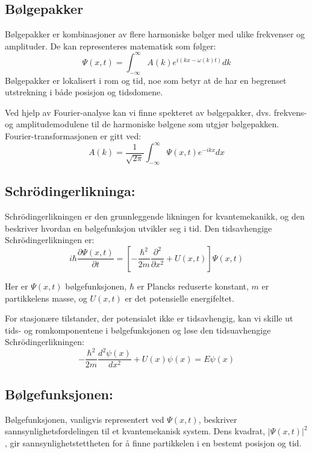 \subsection*{Bølgepakker}

Bølgepakker er kombinasjoner av flere harmoniske bølger med ulike frekvenser og amplituder. De kan representeres matematisk som følger:
\begin{equation*}
\Psi(x,t) = \int_{-\infty}^{\infty} A(k) e^{i(kx - \omega(k)t)} dk
\end{equation*}
Bølgepakker er lokalisert i rom og tid, noe som betyr at de har en begrenset utstrekning i både posisjon og tidsdomene.

Ved hjelp av Fourier-analyse kan vi finne spekteret av bølgepakker, dvs. frekvens- og amplitudemodulene til de harmoniske bølgene som utgjør bølgepakken. Fourier-transformasjonen er gitt ved:
\begin{equation*}
A(k) = \frac{1}{\sqrt{2\pi}} \int_{-\infty}^{\infty} \Psi(x,t) e^{-ikx} dx
\end{equation*}
\subsection*{Schrödingerlikninga:}

Schrödingerlikningen er den grunnleggende likningen for kvantemekanikk, og den beskriver hvordan en bølgefunksjon utvikler seg i tid. Den tidsavhengige Schrödingerlikningen er:
\begin{equation*}
i\hbar\frac{\partial \Psi(x,t)}{\partial t} = \left[-\frac{\hbar^2}{2m}\frac{\partial^2}{\partial x^2} + U(x,t)\right]\Psi(x,t)
\end{equation*}

Her er $\Psi(x,t)$ bølgefunksjonen, $\hbar$ er Plancks reduserte konstant, $m$ er partikkelens masse, og $U(x,t)$ er det potensielle energifeltet.

For stasjonære tilstander, der potensialet ikke er tidsavhengig, kan vi skille ut tids- og romkomponentene i bølgefunksjonen og løse den tidsuavhengige Schrödingerlikningen:
\begin{equation*}
-\frac{\hbar^2}{2m}\frac{d^2\psi(x)}{dx^2} + U(x)\psi(x) = E\psi(x)
\end{equation*}

\subsection*{Bølgefunksjonen:}

Bølgefunksjonen, vanligvis representert ved $\Psi(x,t)$, beskriver sannsynlighetsfordelingen til et kvantemekanisk system. Dens kvadrat, $|\Psi(x,t)|^2$, gir sannsynlighetstettheten for å finne partikkelen i en bestemt posisjon og tid.

